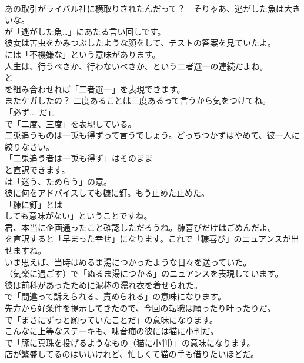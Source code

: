 \documentclass[8pt]{extreport}
\begin{document}
\begin{CJK}{UTF8}{min}
\\	あの取引がライバル社に横取りされたんだって？　そりゃあ、逃がした魚は大きいな。 
\\	が「逃がした魚…」にあたる言い回しです。	
\\	彼女は苦虫をかみつぶしたような顔をして、テストの答案を見ていたよ。 
\\	には「不機嫌な」という意味があります。	
\\	人生は、行うべきか、行わないべきか、という二者選一の連続だよね。 
\\	と
\\	を組み合わせれば「二者選一」を表現できます。	
\\	またケガしたの？ 二度あることは三度あるって言うから気をつけてね。 
\\	「必ず... だ」。
\\	で「二度、三度」を表現している。	
\\	二兎追うものは一兎も得ずって言うでしょう。どっちつかずはやめて、彼一人に絞りなさい。 
\\	「二兎追う者は一兎も得ず」はそのまま 
\\	と直訳できます。
\\	は「迷う、ためらう」の意。	
\\	彼に何をアドバイスしても糠に釘。もう止めた止めた。 
\\	「糠に釘」とは
\\	しても意味がない」ということですね。	
\\	君、本当に企画通ったこと確認しただろうね。糠喜びだけはごめんだよ。 
\\	を直訳すると「早まった幸せ」になります。これで「糠喜び」のニュアンスが出せますね。	
\\	いま思えば、当時はぬるま湯につかったような日々を送っていた。 
\\	（気楽に過ごす）で「ぬるま湯につかる」のニュアンスを表現しています。	
\\	彼は前科があったために泥棒の濡れ衣を着せられた。 
\\	で「間違って訴えられる、責められる」の意味になります。	
\\	先方から好条件を提示してきたので、今回の転職は願ったり叶ったりだ。 
\\	で「まさにずっと願っていたことだ」の意味になります。	
\\	こんなに上等なステーキも、味音痴の彼には猫に小判だ。 
\\	で「豚に真珠を投げるようなもの（猫に小判）」の意味になります。	
\\	店が繁盛してるのはいいけれど、忙しくて猫の手も借りたいほどだ。 

\end{CJK}
\end{document}
